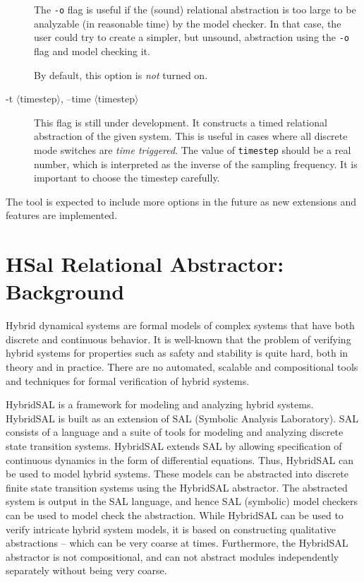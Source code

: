\documentclass{article}
\begin{document}
\begin{description}
 The {\tt{-o}} flag is useful if the (sound) relational abstraction
 is too large to be analyzable (in reasonable time) by the model checker.
 In that case, the user could try to create a simpler, but unsound,
 abstraction using the {\tt{-o}} flag and model checking it.
 
 By default, this option is {\em{not}} turned on.

\item[-t $\langle$timestep$\rangle$, --time $\langle$timestep$\rangle$]
 This flag is still under development.
 It constructs  a timed relational abstraction of the given system.
 This is useful in cases where all discrete mode switches are
 {\em{time triggered}}.  The value of {\tt{timestep}} should be
 a real number, which is interpreted as the inverse of the
 sampling frequency.  It is important to choose the
 timestep carefully.
\end{description}

The tool is expected to include more options in the future
as new extensions and features are implemented.

\section{HSal Relational Abstractor: Background}

Hybrid dynamical systems are formal models of complex systems 
that have both discrete and continuous behavior.  
It is well-known that the problem of verifying hybrid systems for
properties such as safety and stability is quite
hard, both in theory and in practice.  There are no automated,
scalable and compositional tools and techniques for formal 
verification of hybrid systems.

HybridSAL is a framework for modeling and analyzing hybrid systems.
HybridSAL is built as an extension of SAL (Symbolic Analysis Laboratory).
SAL consists of a language and a suite of tools for modeling and 
analyzing discrete state transition systems.  HybridSAL extends SAL 
by allowing specification of continuous dynamics in the form of 
differential equations.
Thus, HybridSAL can be used to model hybrid systems.
These models can be abstracted into discrete  finite state transition
systems using the HybridSAL abstractor.  The abstracted system
is output in the SAL language, and hence SAL (symbolic) model 
checkers can be used to model check the abstraction.
While HybridSAL can be used to verify intricate hybrid system models,
it is based on constructing qualitative abstractions -- which can
be very coarse at times.  Furthermore, the HybridSAL abstractor is
not compositional, and can not abstract modules independently
separately without being very coarse.
\end{document}
